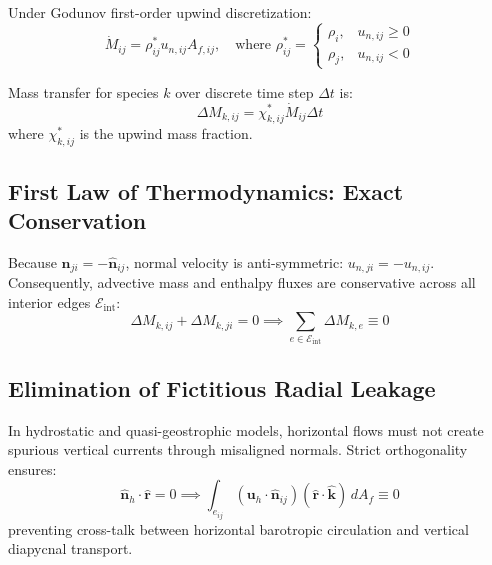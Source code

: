 \documentclass[11pt,a4paper]{article}
\begin{document}
Under Godunov first-order upwind discretization:
\begin{equation}
\dot{M}_{ij} = \rho^*_{ij} u_{n, ij} A_{f, ij}, \quad \text{where } \rho^*_{ij} = \begin{cases}
\rho_i, & u_{n, ij} \ge 0 \\
\rho_j, & u_{n, ij} < 0
\end{cases}
\end{equation}

Mass transfer for species $k$ over discrete time step $\Delta t$ is:
\begin{equation}
\Delta M_{k, ij} = \chi^*_{k, ij} \dot{M}_{ij} \Delta t
\end{equation}
where $\chi^*_{k, ij}$ is the upwind mass fraction.

\subsection{First Law of Thermodynamics: Exact Conservation}
Because $\hat{\mathbf{n}}_{ji} = -\hat{\mathbf{n}}_{ij}$, normal velocity is anti-symmetric: $u_{n, ji} = -u_{n, ij}$. Consequently, advective mass and enthalpy fluxes are conservative across all interior edges $\mathcal{E}_{\text{int}}$:
\begin{equation}
\Delta M_{k, ij} + \Delta M_{k, ji} = 0 \implies \sum_{e \in \mathcal{E}_{\text{int}}} \Delta M_{k, e} \equiv 0
\end{equation}

\subsection{Elimination of Fictitious Radial Leakage}
In hydrostatic and quasi-geostrophic models, horizontal flows must not create spurious vertical currents through misaligned normals. Strict orthogonality ensures:
\begin{equation}
\hat{\mathbf{n}}_h \cdot \hat{\mathbf{r}} = 0 \implies \int_{e_{ij}} (\mathbf{u}_h \cdot \hat{\mathbf{n}}_{ij}) (\hat{\mathbf{r}} \cdot \hat{\mathbf{k}}) \, dA_f \equiv 0
\end{equation}
preventing cross-talk between horizontal barotropic circulation and vertical diapycnal transport.
\end{document}
